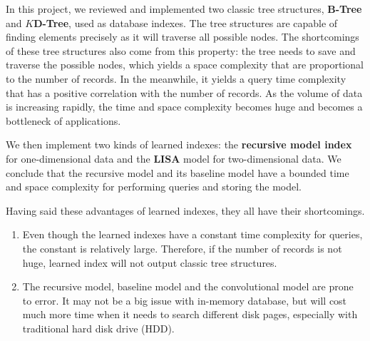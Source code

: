 In this project, we reviewed and implemented two classic tree structures, \textbf{B-Tree} and \textbf{$K$D-Tree}, used as database indexes. The tree structures are capable of finding elements precisely as it will traverse all possible nodes. The shortcomings of these tree structures also come from this property: the tree needs to save and traverse the possible nodes, which yields a space complexity that are proportional to the number of records. In the meanwhile, it yields a query time complexity that has a positive correlation with the number of records. As the volume of data is increasing rapidly, the time and space complexity becomes huge and becomes  a bottleneck of applications.

We then implement two kinds of learned indexes: the \textbf{recursive model index} for one-dimensional data and the \textbf{LISA} model for two-dimensional data. We conclude that the recursive model and its baseline model have a bounded time and space complexity for performing queries and storing the model.


Having said these advantages of learned indexes, they all have their shortcomings.

\begin{enumerate}
	\item Even though the learned indexes have a constant time complexity for queries, the constant is relatively large. Therefore, if the number of records is not huge, learned index will not output classic tree structures.
	\item The recursive model, baseline model and the convolutional model are prone to error. It may not be a big issue with in-memory database, but will cost much more time when it needs to search different disk pages, especially with traditional hard disk drive (HDD).
\end{enumerate}